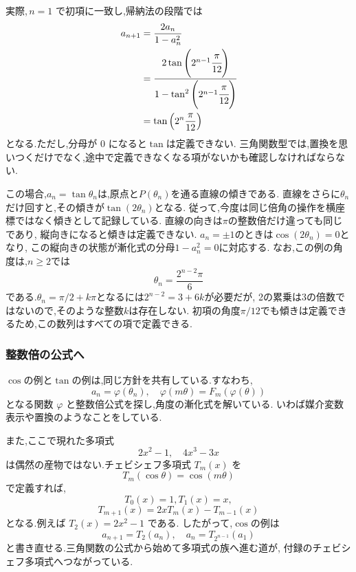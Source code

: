     実際,\,$n=1$ で初項に一致し,帰納法の段階では
    \begin{align*}
      a_{n+1}
        &=\frac{2a_n}{1-a_n^2}\\
        &=\cfrac{2\tan\left(2^{n-1}\cfrac{\pi}{12}\right)}
                {1-\tan^2\left(2^{n-1}\cfrac{\pi}{12}\right)}\\
        &=\tan\left(2^n\frac{\pi}{12}\right)
    \end{align*}
    となる.ただし,分母が $0$ になると$\tan$は定義できない.
    三角関数型では,置換を思いつくだけでなく,途中で定義できなくなる項がないかも確認しなければならない.
    
    この場合,$a_n=\tan\theta_n$は,原点と$P(\theta_n)$を通る直線の傾きである.
    直線をさらに$\theta_n$だけ回すと,その傾きが$\tan(2\theta_n)$となる.
    従って,今度は同じ倍角の操作を横座標ではなく傾きとして記録している.
    直線の向きは$\pi$の整数倍だけ違っても同じであり,
    縦向きになると傾きは定義できない.
    $a_n=\pm1$のときは$\cos(2\theta_n)=0$となり,
    この縦向きの状態が漸化式の分母$1-a_n^2=0$に対応する.
    なお,この例の角度は,$n\geq2$では
    \[
      \theta_n=\frac{2^{n-2}\pi}{6}
    \]
    である.$\theta_n=\pi/2+k\pi$となるには$2^{n-2}=3+6k$が必要だが,
    2の累乗は3の倍数ではないので,そのような整数$k$は存在しない.
    初項の角度$\pi/12$でも傾きは定義できるため,この数列はすべての項で定義できる.
    
  \subsubsection{整数倍の公式へ}\label{節：整数倍の公式へ}
    $\cos$の例と$\tan$の例は,同じ方針を共有している.すなわち,
    \[
      a_n=\varphi(\theta_n),
      \quad
      \varphi(m\theta)=F_m(\varphi(\theta))
    \]
    となる関数 $\varphi$ と整数倍公式を探し,角度の漸化式を解いている.
    いわば媒介変数表示や置換のようなことをしている.
    
    また,ここで現れた多項式
    \[
      2x^2-1,
      \quad
      4x^3-3x
    \]
    は偶然の産物ではない.チェビシェフ多項式 $T_m(x)$ を
    \[
      T_m(\cos\theta)=\cos(m\theta)
    \]
    で定義すれば,
    \[
      T_0(x)=1,  T_1(x)=x,
    \]
    \[
      T_{m+1}(x)=2xT_m(x)-T_{m-1}(x)
    \]
    となる.例えば $T_2(x)=2x^2-1$ である.
    したがって,$\cos$の例は
    \[
      a_{n+1}=T_2(a_n),
      \quad
      a_n=T_{2^{n-1}}(a_1)
    \]
    と書き直せる.三角関数の公式から始めて多項式の族へ進む道が,
    付録のチェビシェフ多項式へつながっている.
